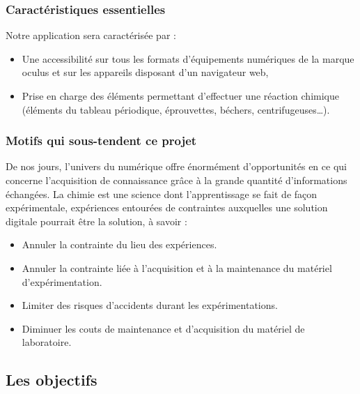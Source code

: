 \subsubsection{Caractéristiques essentielles}

Notre application sera caractérisée par :

\begin{itemize}
	\item Une accessibilité sur tous les formats d’équipements numériques de la marque oculus et sur les appareils disposant d’un navigateur web,
	\item Prise en charge des éléments permettant d’effectuer une réaction chimique (éléments du tableau périodique, éprouvettes, béchers, centrifugeuses…).
\end{itemize}

\subsubsection{Motifs qui sous-tendent ce projet}

De nos jours, l’univers du numérique offre énormément d'opportunités en ce qui concerne l'acquisition de connaissance grâce à la grande quantité d’informations échangées. 
La chimie est une science dont l'apprentissage se fait de façon expérimentale, expériences entourées de contraintes auxquelles une solution digitale pourrait être la solution, à savoir :

\begin{itemize}
	\item Annuler la contrainte du lieu des expériences.
	\item Annuler la contrainte liée à l’acquisition et à la maintenance du matériel d'expérimentation.
	\item Limiter des risques d’accidents durant les expérimentations.
	\item Diminuer les couts de maintenance et d’acquisition du matériel de laboratoire.
\end{itemize}

\subsection{Les objectifs}

